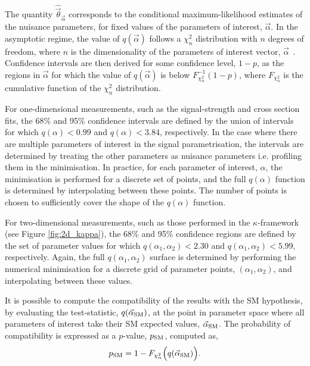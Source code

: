 \noindent
The quantity $\hat{\vec{\theta}}_{\vec{\alpha}}$ corresponds to the conditional maximum-likelihood estimates of the nuisance parameters, for fixed values of the parameters of interest, $\vec{\alpha}$. In the asymptotic regime,  the value of $q(\vec{\alpha})$ follows a $\chi_n^2$ distribution with $n$ degrees of freedom, where $n$ is the dimensionality of the parameters of interest vector, $\vec{\alpha}$~\cite{Cowan:2010js}. Confidence intervals are then derived for some confidence level, $1-p$, as the regions in $\vec{\alpha}$ for which the value of $q(\vec{\alpha})$ is below $F^{-1}_{\chi^2_n}(1-p)$, where $F_{\chi^2_n}$ is the cumulative function of the $\chi^2_n$ distribution.

For one-dimensional measurements, such as the signal-strength and cross section fits, the 68\% and 95\% confidence intervals are defined by the union of intervals for which $q(\alpha)<0.99$ and $q(\alpha)<3.84$, respectively. In the case where there are multiple parameters of interest in the signal parametrisation, the intervals are determined by treating the other parameters as nuisance parameters i.e. profiling them in the minimisation. In practice, for each parameter of interest, $\alpha$, the minimisation is performed for a discrete set of points, and the full $q(\alpha)$ function is determined by interpolating between these points. The number of points is chosen to sufficiently cover the shape of the $q(\alpha)$ function.

For two-dimensional measurements, such as those performed in the $\kappa$-framework (see Figure \ref{fig:2d_kappa}), the 68\% and 95\% confidence regions are defined by the set of parameter values for which $q(\alpha_1,\alpha_2)<2.30$ and $q(\alpha_1,\alpha_2)<5.99$, respectively. Again, the full $q(\alpha_1,\alpha_2)$ surface is determined by performing the numerical minimisation for a discrete grid of parameter points, $(\alpha_1,\alpha_2)$, and interpolating between these values.

It is possible to compute the compatibility of the results with the SM hypothesis, by evaluating the test-statistic, $q(\vec{\alpha}_{\rm{SM}})$, at the point in parameter space where all parameters of interest take their SM expected values, $\vec{\alpha}_{\rm{SM}}$. The probability of compatibility is expressed as a $p$-value, $p_{\rm{SM}}$, computed as,
\begin{equation}
    p_{\rm{SM}} = 1-F_{\chi^2_n}\Big(q(\vec{\alpha}_{\rm{SM}})\Big).
\end{equation}

